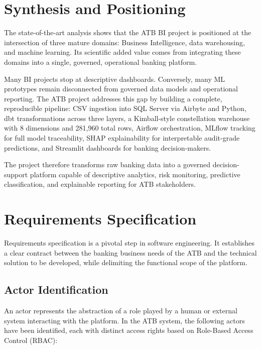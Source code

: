 \section{Synthesis and Positioning}

The state-of-the-art analysis shows that the ATB BI project is positioned at the
intersection of three mature domains: Business Intelligence, data warehousing, and machine
learning. Its scientific added value comes from integrating these domains into a single,
governed, operational banking platform.

Many BI projects stop at descriptive dashboards. Conversely, many ML prototypes remain
disconnected from governed data models and operational reporting. The ATB project addresses
this gap by building a complete, reproducible pipeline: CSV ingestion into SQL Server via
Airbyte and Python, dbt transformations across three layers, a Kimball-style constellation
warehouse with 8 dimensions and 281,960 total rows, Airflow orchestration, MLflow tracking
for full model traceability, SHAP explainability for interpretable audit-grade predictions,
and Streamlit dashboards for banking decision-makers.

The project therefore transforms raw banking data into a governed decision-support platform
capable of descriptive analytics, risk monitoring, predictive classification, and explainable
reporting for ATB stakeholders.


\section{Requirements Specification}

Requirements specification is a pivotal step in software engineering. It establishes a
clear contract between the banking business needs of the ATB and the technical solution to
be developed, while delimiting the functional scope of the platform.

\subsection{Actor Identification}

An actor represents the abstraction of a role played by a human or external system
interacting with the platform. In the ATB system, the following actors have been
identified, each with distinct access rights based on Role-Based Access Control (RBAC):

